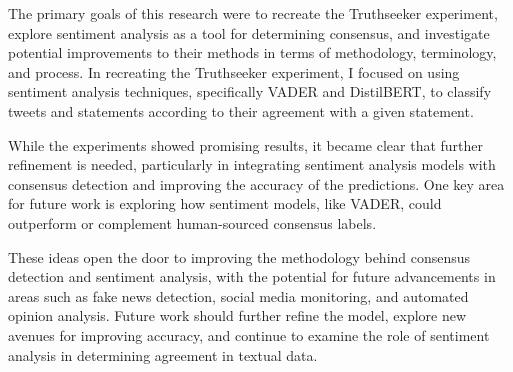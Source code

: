 \documentclass[14]{article}
\begin{document}
The primary goals of this research were to recreate the Truthseeker experiment, explore sentiment analysis as a tool for determining consensus, and investigate potential improvements to their methods in terms of methodology, terminology, and process. In recreating the Truthseeker experiment, I focused on using sentiment analysis techniques, specifically VADER and DistilBERT, to classify tweets and statements according to their agreement with a given statement.

While the experiments showed promising results, it became clear that further refinement is needed, particularly in integrating sentiment analysis models with consensus detection and improving the accuracy of the predictions. One key area for future work is exploring how sentiment models, like VADER, could outperform or complement human-sourced consensus labels.

These ideas open the door to improving the methodology behind consensus detection and sentiment analysis, with the potential for future advancements in areas such as fake news detection, social media monitoring, and automated opinion analysis. Future work should further refine the model, explore new avenues for improving accuracy, and continue to examine the role of sentiment analysis in determining agreement in textual data.

\nocite{bert}



\end{document}
